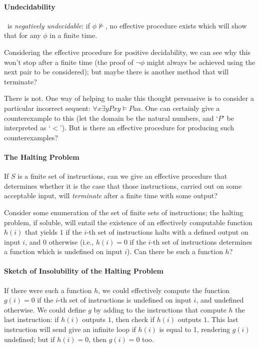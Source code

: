 \paragraph{Undecidability}

\begin{theorem}
	\ltwo\ is \emph{negatively undecidable}: if $\phi\not\vDash$, no effective procedure exists which will show that for any $\phi$ in a finite time.
\end{theorem} Considering the effective procedure for positive decidability, we can see why this won't stop after a finite time (the proof of $\neg\phi$ might always be achieved using the next pair to be considered); but maybe there is another method that will terminate?  

There is not.  One way of helping to make this thought persuasive is to consider a particular incorrect sequent:  $\forall x \exists y Pxy \vDash Paa$. One can certainly give a counterexample to this (let the domain be the natural numbers, and `$P$' be interpreted as `$<$'). But is there an effective procedure for producing such counterexamples?


\paragraph{The Halting Problem}

If $S$ is a finite set of instructions, can we give an effective procedure that determines whether  it is the case that those instructions, carried out on some acceptable input, will \emph{terminate} after a finite time with some output?

 Consider some enumeration of the set of finite sets of instructions; the halting problem, if soluble, will entail the existence of an effectively computable function $h(i)$ that yields $1$ if the $i$-th set of instructions halts with a defined output on input $i$, and $0$ otherwise (i.e., $h(i) =0$ if the $i$-th set of instructions determines a function which is undefined on input $i$). Can there be such a function $h$?


\paragraph{Sketch of Insolubility of the Halting Problem}

If there were such a function $h$, we could effectively compute the function $g(i) = 0$ if the $i$-th set of instructions is undefined on input $i$, and undefined otherwise. We could define $g$ by adding to the instructions that compute $h$ the last instruction: if $h(i)$ outputs $1$, then check if $h(i)$ outputs $1$. This last instruction will send give an infinite loop if $h(i)$ is equal to 1, rendering $g(i)$ undefined; but if $h(i)=0$, then $g(i)=0$ too. 

